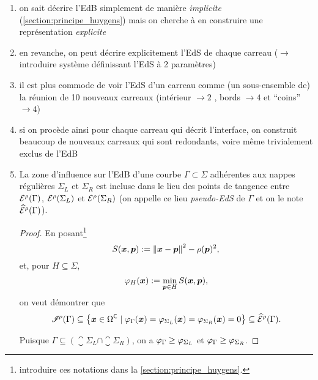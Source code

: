 \begin{enumerate}
	\item on sait décrire l'EdB simplement de manière \textit{implicite} (\cf \autoref{section:principe_huygens}) mais on cherche à en construire une représentation \textit{explicite}
	\item en revanche, on peut décrire explicitement l'EdS de chaque carreau ($\to$ introduire système définissant l'EdS à 2 paramètres)
	\item il est plus commode de voir l'EdS d'un carreau comme (un sous-ensemble de) la réunion de 10 nouveaux carreaux (intérieur $\to 2$ , bords $\to 4$ et ``coins'' $\to 4$)
	\item si on procède ainsi pour chaque carreau qui décrit l'interface, on construit beaucoup de nouveaux carreaux qui sont redondants, voire même trivialement exclus de l'EdB
	\item La zone d'influence sur l'EdB d'une courbe $\Gamma \subset \Sigma$ adhérentes aux nappes régulières $\Sigma_L$ et $\Sigma_R$ est incluse dans le lieu des points de tangence entre ${\mathcal{E}}^{\rho}({\Gamma})$, ${\mathcal{E}}^{\rho}({\Sigma_L})$ et ${\mathcal{E}}^{\rho}({\Sigma_R})$ (on appelle ce lieu \textit{pseudo-EdS} de $\Gamma$ et on le note $\widehat{\mathcal{E}}^{\rho}({\Gamma})$).
	\begin{proof}
		En posant\footnote{introduire ces notations dans la \autoref{section:principe_huygens}.}
		\[
			S(\boldsymbol{x}, \boldsymbol{p}) := \left\| {\boldsymbol{x} - \boldsymbol{p}} \right\|^2 - \rho(\boldsymbol{p})^2,
		\]
		et, pour $H \subseteq \Sigma$, 
		\[
			\varphi_{H}(\boldsymbol{x}) := \min_{\boldsymbol{p} \in H} S(\boldsymbol{x}, \boldsymbol{p}),
		\]
		on veut démontrer que 
		\[
			\mathscr{I}^{\!\rho}({\Gamma}) \subseteq 
			\left\{
				\boldsymbol{x} \in \Omega^\mathsf{C} \mid \varphi_{\Gamma}(\boldsymbol{x}) = \varphi_{\Sigma_L}(\boldsymbol{x}) = \varphi_{\Sigma_R}(\boldsymbol{x}) = 0
			\right\}
			\subseteq \widehat{\mathcal{E}}^{\rho}({\Gamma}).
		\]
		\par
		Puisque $\Gamma \subseteq \left( \closure{\Sigma_L} \cap \closure{\Sigma_R} \right)$, on a $\varphi_{\Gamma} \geq \varphi_{\Sigma_L}$ et $\varphi_{\Gamma} \geq \varphi_{\Sigma_R}$.\par

\end{proof}
\end{enumerate}
